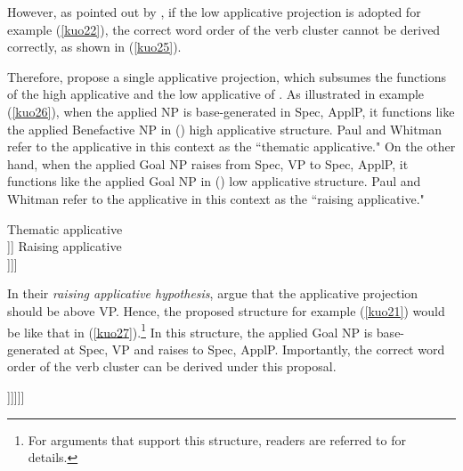 \documentclass[output=paper,colorlinks,citecolor=brown]{langscibook}
\begin{document}
However, as pointed out by \citet{Paul&Whitman2010}, if the low applicative projection is adopted for example (\ref{kuo22}), the correct word order of the verb cluster cannot be derived correctly, as shown in (\ref{kuo25}).

\z

Therefore, \citet{Paul&Whitman2010} propose a single applicative projection, which subsumes the functions of the high applicative and the low applicative of \citet{Pylkkanen2002, Pylkkanen2008}. As illustrated in example (\ref{kuo26}), when the applied NP is base-generated in Spec, ApplP, it functions like the applied Benefactive NP in  (\citeyear{Pylkkanen2002, Pylkkanen2008}) high applicative structure. Paul and Whitman refer to the applicative in this context as the “thematic applicative." On the other hand, when the applied Goal NP raises from Spec, VP to Spec, ApplP, it functions like the applied Goal NP in  (\citeyear{Pylkkanen2002, Pylkkanen2008}) low applicative structure. Paul and Whitman refer to the applicative in this context as the “raising applicative."

\ea
\label{kuo26}
    \ea
        \glt Thematic applicative\\
        \glt [\textsubscript{APPLP} DP\textsubscript{Benefactive} [\textsubscript{APPL'} Appl [\textsubscript{VP} V DP]]]
    \ex
        \glt Raising applicative\\
        \glt [\textsubscript{APPLP} DP\textsubscript{Goal} [\textsubscript{APPL'} Appl [\textsubscript{VP} t\textsubscript{Goal} [\textsubscript{V'} V DP\textsubscript{Theme} ]]]]
    \z
\z

In their \textit{raising applicative hypothesis}, \citet{Paul&Whitman2010} argue that the applicative projection should be above VP. Hence, the proposed structure for example (\ref{kuo21}) would be like that in (\ref{kuo27}).\footnote{For arguments that support this structure, readers are referred to \citet{Paul&Whitman2010} for details.} In this structure, the applied Goal NP is base-generated at Spec, VP and raises to Spec, ApplP. Importantly, the correct word order of the verb cluster can be derived under this proposal.

\ea
\label{kuo27}
\glt [\textsubscript{TP} Zhangsan [\textsubscript{AspP} xie-gei-le  [\textsubscript{ApplP}  Lisi [\textsubscript{Appl'} t\textsubscript{xie-gei} [\textsubscript{VP} t\textsubscript{Lisi}  [\textsubscript{V'} t\textsubscript{xie}  yi-feng          xin.]]]]]]\\  
\z
\end{document}

